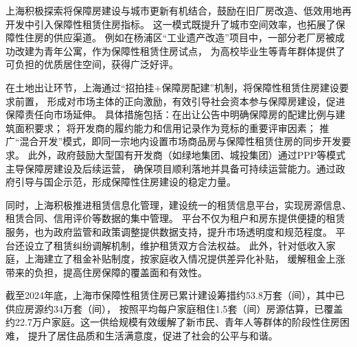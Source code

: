 上海积极探索将保障房建设与城市更新有机结合，鼓励在旧厂房改造、低效用地再开发中引入保障性租赁住房指标。
这一模式既提升了城市空间效率，也拓展了保障性住房的供应渠道。
例如在杨浦区“工业遗产改造”项目中，一部分老厂房被成功改建为青年公寓，作为保障性租赁住房试点，
为高校毕业生等青年群体提供了可负担的优质居住空间，获得广泛好评。

在土地出让环节，上海通过“招拍挂+保障房配建”机制，将保障性租赁住房建设要求前置，
形成对市场主体的正向激励，有效引导社会资本参与保障房建设，促进保障责任向市场延伸。
具体措施包括：在出让公告中明确保障房的配建比例与建筑面积要求；
将开发商的履约能力和信用记录作为竞标的重要评审因素；
推广“混合开发”模式，即同一宗地内设置市场商品房与保障性租赁住房的同步开发要求。
此外，政府鼓励大型国有开发商（如绿地集团、城投集团）通过PPP等模式主导保障房建设及后续运营，
确保项目顺利落地并具备可持续运营能力。通过政府引导与国企示范，形成保障性住房建设的稳定力量。

同时，上海积极推进租赁信息化管理，建设统一的租赁信息平台，实现房源信息、租赁合同、信用评价等数据的集中管理。
平台不仅为租户和房东提供便捷的租赁服务，也为政府监管和政策调整提供数据支持，提升市场透明度和规范程度。
平台还设立了租赁纠纷调解机制，维护租赁双方合法权益。
此外，针对低收入家庭，上海建立了租金补贴制度，按家庭收入情况提供差异化补贴，
缓解租金上涨带来的负担，提高住房保障的覆盖面和有效性。

截至2024年底，上海市保障性租赁住房已累计建设筹措约53.8万套（间），其中已供应房源约34万套（间），
按照平均每户家庭租住1.5套（间）房源估算，已覆盖约22.7万户家庭。这一供给规模有效缓解了新市民、青年人等群体的阶段性住房困难，
提升了居住品质和生活满意度，促进了社会的公平与和谐。